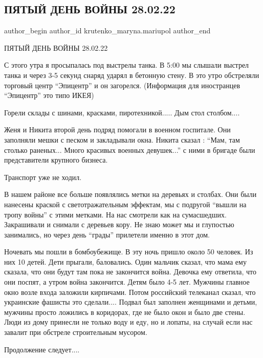  
 
 
 
 

\subsection{ПЯТЫЙ ДЕНЬ ВОЙНЫ 28.02.22}
\label{sec:28_02_2023.fb.krutenko_maryna.mariupol.1.pyatii_den_voini_28_}

\ifcmt
 author_begin
   author_id krutenko_maryna.mariupol
 author_end
\fi

ПЯТЫЙ ДЕНЬ ВОЙНЫ 28.02.22

С этого утра я просыпалась под выстрелы танка. В 5:00 мы слышали выстрел танка
и через 3-5 секунд снаряд ударял в бетонную стену. В это утро обстреляли
торговый центр \enquote{Эпицентр} и он загорелся. (Информация для иностранцев
\enquote{Эпицентр} это типо ИКЕЯ) 

Горели склады с шинами, красками, пиротехникой..... Дым стол столбом....

Женя и Никита второй день подряд помогали в военном госпитале. Они заполняли
мешки с песком и закладывали окна. Никита сказал : \enquote{Мам, там столько раненых...
Много красивых военных девушек...} с ними в бригаде были представители крупного
бизнеса. 

Транспорт уже не ходил.

В нашем районе все больше появлялись метки на деревьях и столбах. Они были
нанесены краской с светотражательным эффектам, мы с подругой \enquote{вышли на тропу
войны} с этими метками. На нас смотрели как на сумасшедших. Закрашивали и
снимали с деревьев кору. Не знаю может мы и глупостью занимались, но через день
\enquote{грады} прилетели именно в этот дом. 

Ночевать мы пошли в бомбоубежище. В эту ночь пришло около 50 человек. Из них 10
детей. Дети прыгали, баловались. Один мальчик сказал, что мама ему сказала, что
они будут там пока не закончится война. Девочка ему ответила, что они поспят, а
утром война закончится. Детям было 4-5 лет. Мужчины главное окно возле входа
заложили кирпичами. Потом российский телеканал сказал, что украинские фашисты
это сделали.... Подвал был заполнен женщинами и детьми, мужчины просто ложились в
коридорах, где не было окон и было две стены. Люди из дому принесли не только
воду и еду, но и лопаты, на случай если нас завалит при обстреле строительным
мусором. 

Продолжение следует....

